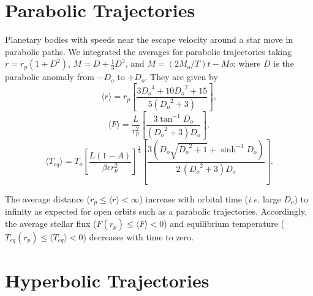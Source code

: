 \documentclass[a4paper,fleqn,usenatbib]{mnras}
\begin{document}

\section{Parabolic Trajectories}
\label{sec:parabolic}
Planetary bodies with speeds near the escape velocity around a star move in parabolic paths. We integrated the averages for parabolic trajectories taking $r=r_p(1+D^2)$, $M=D+\frac{1}{3}D^3$, and $M=(2M_o/T)t-Mo$; where $D$ is the parabolic anomaly from $-D_o$ to $+D_o$. They are given by
\begin{equation} \label{eq:rp}
\langle r \rangle = r_p \left[ \frac{3 {D_o}^{4} + 10 {D_o}^{2} + 15}{5 \left({D_o}^{2} + 3\right)} \right],
\end{equation}
\begin{equation} \label{eq:Fp}
\langle F \rangle = \frac{L}{r_p^2} \left[ \frac{3 \tan^{-1} D_o}{{\left({D_o}^2 + 3\right)} D_o} \right],
\end{equation}
\begin{equation} \label{eq:Tp}
\langle T_{eq} \rangle = T_o \left[\frac{L {\left(1 - A\right)}}{\beta \epsilon r_p^{2}}\right]^{\frac{1}{4}} \left[ \frac{3 {\left(D_o\sqrt{{D_o}^{2} + 1} + \sinh^{-1} D_o \right)}}{2 \, {\left({D_o}^{2} + 3\right)} D_o} \right].
\end{equation}

The average distance ($r_p \leq \langle r \rangle < \infty$) increase with orbital time (\emph{i.e.} large $D_o$) to infinity as expected for open orbits such as a parabolic trajectories. Accordingly, the average stellar flux ($F(r_p) \leq \langle F \rangle < 0$) and equilibrium temperature ($T_{eq}(r_p) \leq \langle T_{eq} \rangle < 0$) decreases with time to zero.


\section{Hyperbolic Trajectories}
\label{sec:hyperbolic}
\end{document}
